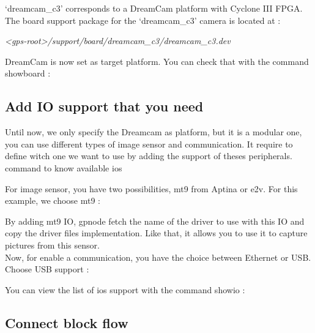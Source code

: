 \documentclass[10pt,a4paper]{article}
\begin{document}
`dreamcam\_c3' corresponds to a DreamCam platform with Cyclone III FPGA. The board support package for the `dreamcam\_c3' camera is located at :

\emph{<gps-root>/support/board/dreamcam\_c3/dreamcam\_c3.dev}

DreamCam is now set as target platform. You can check that with the command showboard :


\subsection{Add IO support that you need}
Until now, we only specify the Dreamcam as platform, but it is a modular one, you can use different types of image sensor and communication. It require to define witch one we want to use by adding the support of theses peripherals. \\

command to know available ios

For image sensor, you have two possibilities, mt9 from Aptina or e2v. For this example, we choose mt9 :


By adding mt9 IO, gpnode fetch the name of the driver to use with this IO and copy the driver files implementation. Like that, it allows you to use it to capture pictures from this sensor.\\

Now, for enable a communication, you have the choice between Ethernet or USB. Choose USB support :


You can view the list of ios support with the command showio :


\subsection{Connect block flow}
\end{document}
